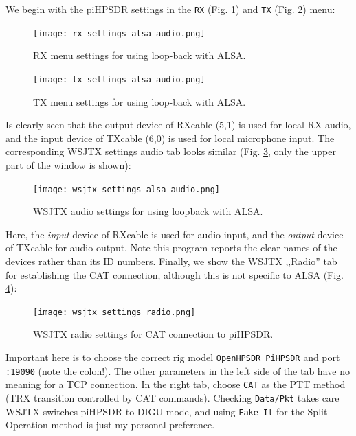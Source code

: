 \documentclass[12pt]{book}
\def\rett#1{\texttt{\color{red}#1}}
\def\bltt#1{\texttt{\color{blue}#1}}
\def\pH{pi\-HPSDR\xspace}
\begin{document}
We begin with the \pH settings in the \bltt{RX} (Fig. \ref{fig:rx_settings_alsa_audio}) and
\bltt{TX} (Fig. \ref{fig:tx_settings_alsa_audio}) menu:

\begin{figure}[ht]
\center
\texttt{[image: rx\_settings\_alsa\_audio.png]}
\caption{RX menu settings for using loop-back with ALSA.}
\label{fig:rx_settings_alsa_audio}
\end{figure}

\begin{figure}[ht]
\center
\texttt{[image: tx\_settings\_alsa\_audio.png]}
\caption{TX menu settings for using loop-back with ALSA.}
\label{fig:tx_settings_alsa_audio}
\end{figure}

Is clearly seen that the output device of RXcable (5,1) is used for local RX audio, and the input
device of TXcable (6,0) is used for local microphone input. The corresponding WSJTX settings audio
tab looks similar (Fig. \ref{fig:wsjtx_settings_alsa_audio}, only the upper part of the
window is shown):

\begin{figure}[ht]
\center
\texttt{[image: wsjtx\_settings\_alsa\_audio.png]}
\caption{WSJTX audio settings for using loopback with ALSA.}
\label{fig:wsjtx_settings_alsa_audio}
\end{figure}

Here, the \textit{input} device of RXcable is used for audio input, and the
\textit{output} device of TXcable for audio output. Note this program reports the
clear names of the devices rather than its ID numbers. Finally, we show the WSJTX ,,Radio''
tab for establishing the CAT connection, although this is not specific to ALSA
(Fig. \ref{fig:wsjtx_settings_radio}):

\begin{figure}[ht]
\center
\texttt{[image: wsjtx\_settings\_radio.png]}
\caption{WSJTX radio settings for CAT connection to \pH.}
\label{fig:wsjtx_settings_radio}
\end{figure}

Important here is to choose the correct rig model \rett{OpenHPSDR PiHPSDR} and
port \rett{:19090} (note the colon!). The other parameters in the left side of the tab
have no meaning for a TCP connection. In the right tab, choose \rett{CAT} as
the PTT method (TRX transition controlled by CAT commands). Checking \rett{Data/Pkt}
takes care WSJTX switches \pH to DIGU mode, and using \rett{Fake It} for the Split
Operation method is just my personal preference.
\end{document}
